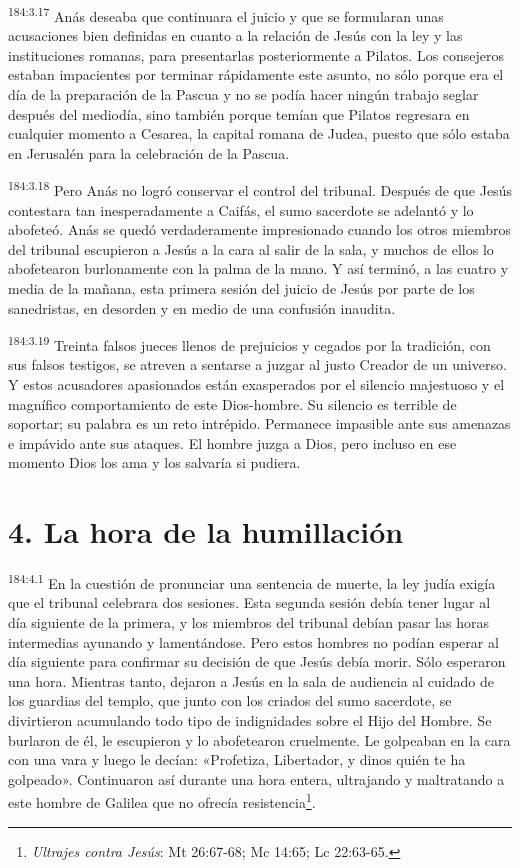 \par
\textsuperscript{184:3.17} Anás deseaba que continuara el juicio y que se formularan unas acusaciones bien definidas en cuanto a la relación de Jesús con la ley y las instituciones romanas, para presentarlas posteriormente a Pilatos. Los consejeros estaban impacientes por terminar rápidamente este asunto, no sólo porque era el día de la preparación de la Pascua y no se podía hacer ningún trabajo seglar después del mediodía, sino también porque temían que Pilatos regresara en cualquier momento a Cesarea, la capital romana de Judea, puesto que sólo estaba en Jerusalén para la celebración de la Pascua.

\par
\textsuperscript{184:3.18} Pero Anás no logró conservar el control del tribunal. Después de que Jesús contestara tan inesperadamente a Caifás, el sumo sacerdote se adelantó y lo abofeteó. Anás se quedó verdaderamente impresionado cuando los otros miembros del tribunal escupieron a Jesús a la cara al salir de la sala, y muchos de ellos lo abofetearon burlonamente con la palma de la mano. Y así terminó, a las cuatro y media de la mañana, esta primera sesión del juicio de Jesús por parte de los sanedristas, en desorden y en medio de una confusión inaudita.

\par
\textsuperscript{184:3.19} Treinta falsos jueces llenos de prejuicios y cegados por la tradición, con sus falsos testigos, se atreven a sentarse a juzgar al justo Creador de un universo. Y estos acusadores apasionados están exasperados por el silencio majestuoso y el magnífico comportamiento de este Dios-hombre. Su silencio es terrible de soportar; su palabra es un reto intrépido. Permanece impasible ante sus amenazas e impávido ante sus ataques. El hombre juzga a Dios, pero incluso en ese momento Dios los ama y los salvaría si pudiera.

\section*{4. La hora de la humillación}
\par
\textsuperscript{184:4.1} En la cuestión de pronunciar una sentencia de muerte, la ley judía exigía que el tribunal celebrara dos sesiones. Esta segunda sesión debía tener lugar al día siguiente de la primera, y los miembros del tribunal debían pasar las horas intermedias ayunando y lamentándose. Pero estos hombres no podían esperar al día siguiente para confirmar su decisión de que Jesús debía morir. Sólo esperaron una hora. Mientras tanto, dejaron a Jesús en la sala de audiencia al cuidado de los guardias del templo, que junto con los criados del sumo sacerdote, se divirtieron acumulando todo tipo de indignidades sobre el Hijo del Hombre. Se burlaron de él, le escupieron y lo abofetearon cruelmente. Le golpeaban en la cara con una vara y luego le decían: «Profetiza, Libertador, y dinos quién te ha golpeado». Continuaron así durante una hora entera, ultrajando y maltratando a este hombre de Galilea que no ofrecía resistencia\footnote{\textit{Ultrajes contra Jesús}: Mt 26:67-68; Mc 14:65; Lc 22:63-65.}.

